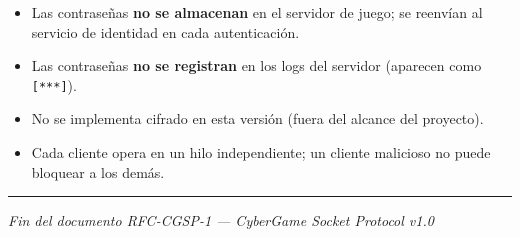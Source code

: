 \documentclass[12pt, letterpaper]{article}
\begin{document}
\begin{itemize}[leftmargin=2em]
    \item Las contraseñas \textbf{no se almacenan} en el servidor de juego; se reenvían al
          servicio de identidad en cada autenticación.
    \item Las contraseñas \textbf{no se registran} en los logs del servidor (aparecen como
          \texttt{[***]}).
    \item No se implementa cifrado en esta versión (fuera del alcance del proyecto).
    \item Cada cliente opera en un hilo independiente; un cliente malicioso no puede
          bloquear a los demás.
\end{itemize}

\vspace{2cm}
\hrule
\vspace{0.3cm}
{\small\centering\textit{Fin del documento RFC-CGSP-1 --- CyberGame Socket Protocol v1.0}\par}
\end{document}
